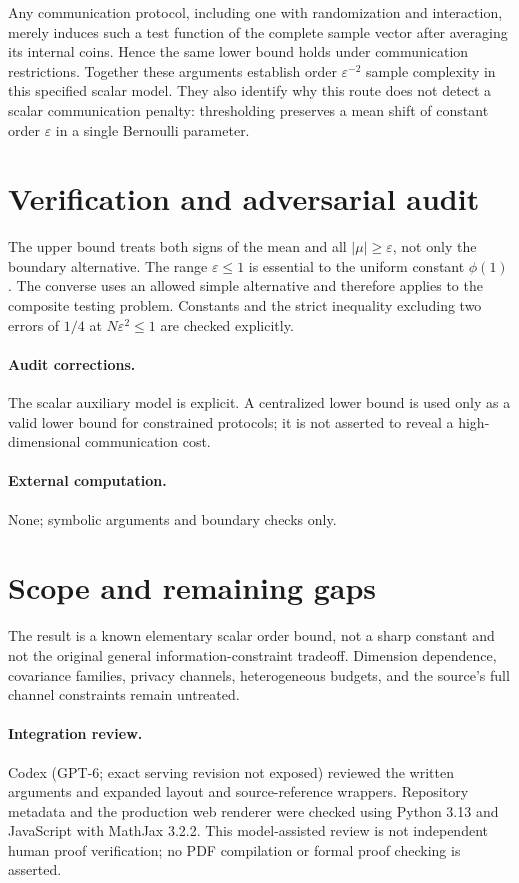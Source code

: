 \documentclass[11pt]{article}
\begin{document}
Any communication protocol, including one with randomization and interaction, merely induces such a test function of the complete sample vector after averaging its internal coins. Hence the same lower bound holds under communication restrictions. Together these arguments establish order $\varepsilon^{-2}$ sample complexity in this specified scalar model. They also identify why this route does not detect a scalar communication penalty: thresholding preserves a mean shift of constant order $\varepsilon$ in a single Bernoulli parameter.
\section{Verification and adversarial audit}
The upper bound treats both signs of the mean and all $|\mu|\geq\varepsilon$, not only the boundary alternative. The range $\varepsilon\leq1$ is essential to the uniform constant $\phi(1)$. The converse uses an allowed simple alternative and therefore applies to the composite testing problem. Constants and the strict inequality excluding two errors of $1/4$ at $N\varepsilon^2\leq1$ are checked explicitly.
\paragraph{Audit corrections.} The scalar auxiliary model is explicit. A centralized lower bound is used only as a valid lower bound for constrained protocols; it is not asserted to reveal a high-dimensional communication cost.
\paragraph{External computation.} None; symbolic arguments and boundary checks only.
\section{Scope and remaining gaps}
The result is a known elementary scalar order bound, not a sharp constant and not the original general information-constraint tradeoff. Dimension dependence, covariance families, privacy channels, heterogeneous budgets, and the source's full channel constraints remain untreated.
\paragraph{Integration review.} Codex (GPT-6; exact serving revision not exposed) reviewed the written arguments and expanded layout and source-reference wrappers. Repository metadata and the production web renderer were checked using Python 3.13 and JavaScript with MathJax 3.2.2. This model-assisted review is not independent human proof verification; no PDF compilation or formal proof checking is asserted.
\end{document}
